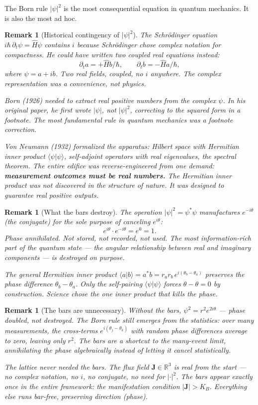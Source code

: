 \documentclass[11pt]{article}
\theoremstyle{tight}
\theoremstyle{plainroman}
\newtheorem{remark}[theorem]{Remark}
\newcommand{\R}{\mathbb{R}}
\begin{document}
The Born rule $|\psi|^2$ is the most consequential equation in quantum mechanics.
It is also the most ad hoc.

\begin{remark}[Historical contingency of $|\psi|^2$]
The Schr\"odinger equation $i\hbar\,\partial_t\psi=\hat H\psi$ contains $i$ because Schr\"odinger chose complex notation for compactness.
He could have written two coupled real equations instead:
\[
\partial_t a = +\hat H b/\hbar, \qquad \partial_t b = -\hat H a/\hbar,
\]
where $\psi=a+ib$.
Two real fields, coupled, no $i$ anywhere.
The complex representation was a convenience, not physics.

Born (1926) needed to extract real positive numbers from the complex $\psi$.
In his original paper, he first wrote $|\psi|$, not $|\psi|^2$, correcting to the squared form \emph{in a footnote}.
The most fundamental rule in quantum mechanics was a footnote correction.

Von Neumann (1932) formalized the apparatus: Hilbert space with Hermitian inner product $\langle\psi|\psi\rangle$, self-adjoint operators with real eigenvalues, the spectral theorem.
The entire edifice was \emph{reverse-engineered} from one demand: \textbf{measurement outcomes must be real numbers.}
The Hermitian inner product was not discovered in the structure of nature.
It was designed to guarantee real positive outputs.
\end{remark}

\begin{remark}[What the bars destroy]
The operation $|\psi|^2=\psi^*\psi$ manufactures $e^{-i\theta}$ (the conjugate) for the sole purpose of canceling $e^{i\theta}$:
\[
e^{i\theta}\cdot e^{-i\theta}=e^0=1.
\]
Phase annihilated.
Not stored, not recorded, not used.
The most information-rich part of the quantum state --- the angular relationship between real and imaginary components --- is destroyed on purpose.

The general Hermitian inner product $\langle a|b\rangle=a^*b=r_a r_b\,e^{i(\theta_b-\theta_a)}$ \emph{preserves} the phase difference $\theta_b-\theta_a$.
Only the self-pairing $\langle\psi|\psi\rangle$ forces $\theta-\theta=0$ by construction.
Science chose the one inner product that kills the phase.
\end{remark}

\begin{remark}[The bars are unnecessary]
Without the bars, $\psi^2=r^2 e^{2i\theta}$ --- phase doubled, not destroyed.
The Born rule still emerges from the statistics: over many measurements, the cross-terms $e^{i(\theta_j-\theta_k)}$ with random phase differences average to zero, leaving only $r^2$.
The bars are a \emph{shortcut} to the many-event limit, annihilating the phase algebraically instead of letting it cancel statistically.

The lattice never needed the bars.
The flux field $\mathbf J\in\R^3$ is real from the start --- no complex notation, no $i$, no conjugate, no need for $|\cdot|^2$.
The bars appear exactly \emph{once} in the entire framework: the manifestation condition $|\mathbf J|>K_B$.
Everything else runs bar-free, preserving direction (phase).
\end{remark}
\end{document}
